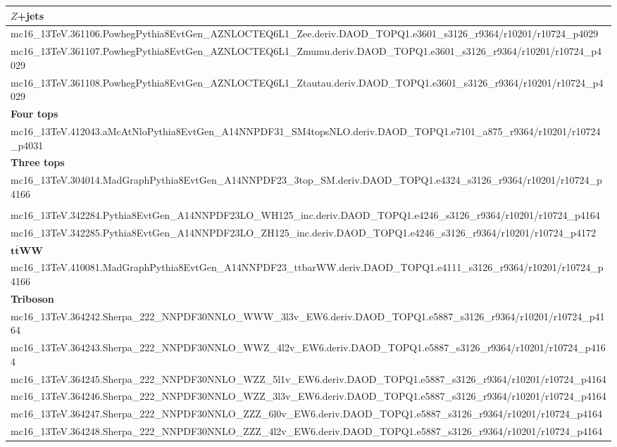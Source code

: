 \begin{table}[htbp]
\begin{adjustwidth}{-0.6cm}{}
\begin{tabular}{l}
			\hline
			\textbf{$Z$+jets} \\
			\hline
			mc16\_13TeV.361106.PowhegPythia8EvtGen\_AZNLOCTEQ6L1\_Zee.deriv.DAOD\_TOPQ1.e3601\_s3126\_r9364/r10201/r10724\_p4029 \\
			mc16\_13TeV.361107.PowhegPythia8EvtGen\_AZNLOCTEQ6L1\_Zmumu.deriv.DAOD\_TOPQ1.e3601\_s3126\_r9364/r10201/r10724\_p4029 \\
			mc16\_13TeV.361108.PowhegPythia8EvtGen\_AZNLOCTEQ6L1\_Ztautau.deriv.DAOD\_TOPQ1.e3601\_s3126\_r9364/r10201/r10724\_p4029 \\
			\hline
			\textbf{Four tops} \\
			\hline
			mc16\_13TeV.412043.aMcAtNloPythia8EvtGen\_A14NNPDF31\_SM4topsNLO.deriv.DAOD\_TOPQ1.e7101\_a875\_r9364/r10201/r10724\_p4031 \\
			\hline
			\textbf{Three tops} \\
			\hline
			mc16\_13TeV.304014.MadGraphPythia8EvtGen\_A14NNPDF23\_3top\_SM.deriv.DAOD\_TOPQ1.e4324\_s3126\_r9364/r10201/r10724\_p4166 \\
			\hline
			\textbf{\VH} \\
			\hline
			mc16\_13TeV.342284.Pythia8EvtGen\_A14NNPDF23LO\_WH125\_inc.deriv.DAOD\_TOPQ1.e4246\_s3126\_r9364/r10201/r10724\_p4164 \\
			mc16\_13TeV.342285.Pythia8EvtGen\_A14NNPDF23LO\_ZH125\_inc.deriv.DAOD\_TOPQ1.e4246\_s3126\_r9364/r10201/r10724\_p4172 \\
			\hline
			$\mathbf{t\bar{t}}$\textbf{WW} \\
			\hline
			mc16\_13TeV.410081.MadGraphPythia8EvtGen\_A14NNPDF23\_ttbarWW.deriv.DAOD\_TOPQ1.e4111\_s3126\_r9364/r10201/r10724\_p4166 \\
			\hline
			\textbf{Triboson} \\
			\hline
			mc16\_13TeV.364242.Sherpa\_222\_NNPDF30NNLO\_WWW\_3l3v\_EW6.deriv.DAOD\_TOPQ1.e5887\_s3126\_r9364/r10201/r10724\_p4164 \\
			mc16\_13TeV.364243.Sherpa\_222\_NNPDF30NNLO\_WWZ\_4l2v\_EW6.deriv.DAOD\_TOPQ1.e5887\_s3126\_r9364/r10201/r10724\_p4164 \\
			mc16\_13TeV.364245.Sherpa\_222\_NNPDF30NNLO\_WZZ\_5l1v\_EW6.deriv.DAOD\_TOPQ1.e5887\_s3126\_r9364/r10201/r10724\_p4164 \\
			mc16\_13TeV.364246.Sherpa\_222\_NNPDF30NNLO\_WZZ\_3l3v\_EW6.deriv.DAOD\_TOPQ1.e5887\_s3126\_r9364/r10201/r10724\_p4164 \\
			mc16\_13TeV.364247.Sherpa\_222\_NNPDF30NNLO\_ZZZ\_6l0v\_EW6.deriv.DAOD\_TOPQ1.e5887\_s3126\_r9364/r10201/r10724\_p4164 \\
			mc16\_13TeV.364248.Sherpa\_222\_NNPDF30NNLO\_ZZZ\_4l2v\_EW6.deriv.DAOD\_TOPQ1.e5887\_s3126\_r9364/r10201/r10724\_p4164 \\
			\bottomrule
		\end{tabular}
		 \end{adjustwidth}
\end{table}


